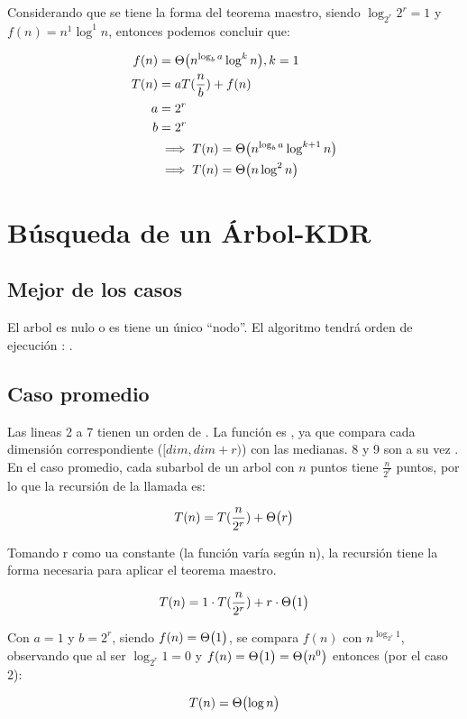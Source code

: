 Considerando que se tiene la forma del teorema maestro,
siendo \(\log_{2^r}{2^r} = 1\) y \(f(n) = n^1 \log^1{n}\),
entonces podemos concluir que:

\begin{equation*}
  \begin{split}
    f(n) &= \mathrm{\Theta}\bigl(n^{\log_b{a}} \log^k{n}\bigr), k = 1 \\
    T(n) &= aT(\frac{n}{b}) + f(n) \\
    a    &= 2^r \\
    b    &= 2^r \\
    &\implies T(n) = \mathrm{\Theta}\bigl(n^{\log_b{a}} \log^{k+1}{n}\bigr) \\
    &\implies T(n) = \mathrm{\Theta}\bigl(n \log^2{n}\bigr)
  \end{split}
\end{equation*}





\section{Búsqueda de un Árbol-KDR}


\subsection{Mejor de los casos}
El arbol es nulo o es tiene un único ``nodo''.
El algoritmo tendrá orden de ejecución : .

\subsection{Caso promedio}
Las lineas 2 a 7 tienen un orden de . La función 
es , ya que compara cada dimensión correspondiente (\([dim, dim+r)\))
con las medianas. 8 y 9 son a su vez .
En el caso promedio, cada subarbol de un arbol con \(n\) puntos tiene
\(\frac{n}{2^r}\) puntos, por lo que la recursión de la llamada es:

\[ T(n) = T(\frac{n}{2^r}) + \mathrm{\Theta}\bigl(r\bigr) \]

Tomando r como ua constante (la función varía según n), la recursión
tiene la forma necesaria para aplicar el teorema maestro.

\[ T(n) = 1 \cdot T(\frac{n}{2^r}) + r \cdot \mathrm{\Theta}\bigl(1\bigr) \]

Con \(a = 1\) y \(b=2^r\), siendo \(f(n) = \mathrm{\Theta}\bigl(1\bigr)\),
se compara \(f(n)\) con \(n^{\log_{2^r}{1}}\), observando que al ser
\(\log_{2^r}{1} = 0\) y \(f(n) = \mathrm{\Theta}\bigl(1\bigr) = \mathrm{\Theta}\bigl(n^0\bigr)\) entonces (por el caso 2):

\[ T(n) = \mathrm{\Theta}\bigl(\log{n}\bigr) \]


